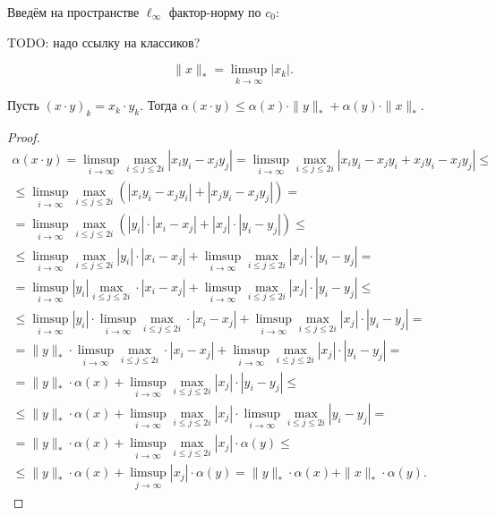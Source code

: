 Введём на пространстве $\ell_\infty$ фактор-норму по $c_0$:

TODO: надо ссылку на классиков?

\begin{equation}
	\|x\|_* = \limsup_{k\to\infty} |x_k|
	.
\end{equation}

\begin{theorem}
	Пусть $(x\cdot y)_k = x_k\cdot y_k$.
	Тогда
	$\alpha(x\cdot y)\leq \alpha(x)\cdot \|y\|_* + \alpha(y)\cdot \|x\|_*$.
\end{theorem}

\begin{proof}
	\begin{multline}
		\alpha(x\cdot y)
		=
		\limsup_{i\to\infty} \max_{i\leq j \leq 2i} |x_i y_i - x_j y_j|
		=
		\limsup_{i\to\infty} \max_{i\leq j \leq 2i} |x_i y_i - x_j y_i + x_j y_i - x_j y_j|
		\leq
		\\ \leq
		\limsup_{i\to\infty} \max_{i\leq j \leq 2i} \left(|x_i y_i - x_j y_i| + |x_j y_i - x_j y_j| \right)
		=
		\\=
		\limsup_{i\to\infty} \max_{i\leq j \leq 2i} \left(|y_i|\cdot|x_i - x_j| + |x_j|\cdot|y_i - y_j| \right)
		\leq
		\\ \leq
		\limsup_{i\to\infty} \max_{i\leq j \leq 2i} |y_i|\cdot|x_i - x_j| + \limsup_{i\to\infty} \max_{i\leq j \leq 2i}|x_j|\cdot|y_i - y_j|
		=
		\\ =
		\limsup_{i\to\infty} |y_i| \max_{i\leq j \leq 2i} \cdot|x_i - x_j| + \limsup_{i\to\infty} \max_{i\leq j \leq 2i}|x_j|\cdot|y_i - y_j|
		\leq
		\\ \leq
		\limsup_{i\to\infty} |y_i| \cdot \limsup_{i\to\infty} \max_{i\leq j \leq 2i} \cdot|x_i - x_j| + \limsup_{i\to\infty} \max_{i\leq j \leq 2i}|x_j|\cdot|y_i - y_j|
		=
		\\ =
		\|y\|_* \cdot \limsup_{i\to\infty} \max_{i\leq j \leq 2i} \cdot|x_i - x_j| + \limsup_{i\to\infty} \max_{i\leq j \leq 2i}|x_j|\cdot|y_i - y_j|
		=
		\\ =
		\|y\|_* \cdot \alpha(x) + \limsup_{i\to\infty} \max_{i\leq j \leq 2i}|x_j|\cdot|y_i - y_j|
		\leq
		\\ \leq
		\|y\|_* \cdot \alpha(x) + \limsup_{i\to\infty} \max_{i\leq j \leq 2i}|x_j|\cdot\limsup_{i\to\infty} \max_{i\leq j \leq 2i}|y_i - y_j|
		=
		\\ =
		\|y\|_* \cdot \alpha(x) + \limsup_{i\to\infty} \max_{i\leq j \leq 2i}|x_j|\cdot \alpha(y)
		\leq
		\\ \leq
		\|y\|_* \cdot \alpha(x) + \limsup_{j\to\infty} |x_j|\cdot \alpha(y)
		=
		\|y\|_* \cdot \alpha(x) + \|x\|_* \cdot \alpha(y)
		.
	\end{multline}
\end{proof}
